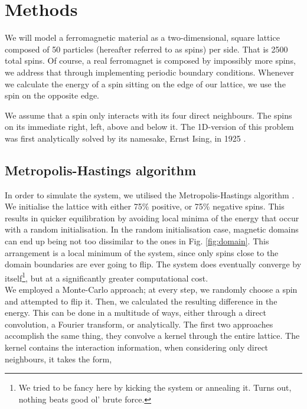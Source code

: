 \documentclass{IAYCPro}
\begin{document}
\section{Methods}
\label{sct: Methods}

We will model a ferromagnetic material as a two-dimensional, square lattice composed of 50 particles (hereafter referred to as spins) per side. That is 2500 total spins. Of course, a real ferromagnet is composed by impossibly more spins,  we address that through implementing periodic boundary conditions. Whenever we calculate the energy of a spin sitting on the edge of our lattice, we use the spin on the opposite edge. 

\raggedbottom
\newpage

We assume that a spin only interacts with its four direct neighbours. The spins on its immediate right, left, above and below it. The 1D-version of this problem was first analytically solved by its namesake, Ernst Ising, in 1925 \cite{Ising}.

\subsection{Metropolis-Hastings algorithm}
In order to simulate the system, we utilised the Metropolis-Hastings algorithm \cite{Hastings, Metropolis}. We initialise the lattice with either 75\% positive, or 75\% negative spins. This results in quicker equilibration by avoiding local minima of the energy that occur with a random initialisation. In the random initialisation case, magnetic domains can end up being not too dissimilar to the ones in Fig. \ref{fig:domain}. This arrangement is a local minimum of the system, since only spins close to the domain boundaries are ever going to flip. The system does eventually converge by itself\footnote{We tried to be fancy here by kicking the system or annealing it. Turns out, nothing beats good ol' brute force.}, but at a significantly greater computational cost.
\\
We employed a Monte-Carlo approach; at every step, we randomly choose a spin and attempted to flip it. Then, we calculated the resulting difference in the energy. This can be done in a multitude of ways, either through a direct convolution, a Fourier transform, or analytically. The first two approaches accomplish the same thing, they convolve a kernel through the entire lattice. The kernel contains the interaction information, when considering only direct neighbours, it takes the form,
\end{document}

